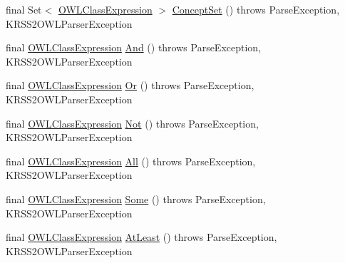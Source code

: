 \begin{DoxyCompactItemize}
\item 
final Set$<$ \hyperlink{interfaceorg_1_1semanticweb_1_1owlapi_1_1model_1_1_o_w_l_class_expression}{O\-W\-L\-Class\-Expression} $>$ \hyperlink{classde_1_1uulm_1_1ecs_1_1ai_1_1owlapi_1_1krssparser_1_1_k_r_s_s2_parser_a1e71dd29caf3474eab3a8c17827a211b}{Concept\-Set} ()  throws Parse\-Exception,     K\-R\-S\-S2\-O\-W\-L\-Parser\-Exception 
\item 
final \hyperlink{interfaceorg_1_1semanticweb_1_1owlapi_1_1model_1_1_o_w_l_class_expression}{O\-W\-L\-Class\-Expression} \hyperlink{classde_1_1uulm_1_1ecs_1_1ai_1_1owlapi_1_1krssparser_1_1_k_r_s_s2_parser_a3d580f7d488fcf9e884bb59ab786f604}{And} ()  throws Parse\-Exception, K\-R\-S\-S2\-O\-W\-L\-Parser\-Exception 
\item 
final \hyperlink{interfaceorg_1_1semanticweb_1_1owlapi_1_1model_1_1_o_w_l_class_expression}{O\-W\-L\-Class\-Expression} \hyperlink{classde_1_1uulm_1_1ecs_1_1ai_1_1owlapi_1_1krssparser_1_1_k_r_s_s2_parser_a8b0db9a91002cdbdc9a36670bc942006}{Or} ()  throws Parse\-Exception, K\-R\-S\-S2\-O\-W\-L\-Parser\-Exception 
\item 
final \hyperlink{interfaceorg_1_1semanticweb_1_1owlapi_1_1model_1_1_o_w_l_class_expression}{O\-W\-L\-Class\-Expression} \hyperlink{classde_1_1uulm_1_1ecs_1_1ai_1_1owlapi_1_1krssparser_1_1_k_r_s_s2_parser_ac8bb49479f32d0def2e9dad0e95f2b25}{Not} ()  throws Parse\-Exception, K\-R\-S\-S2\-O\-W\-L\-Parser\-Exception 
\item 
final \hyperlink{interfaceorg_1_1semanticweb_1_1owlapi_1_1model_1_1_o_w_l_class_expression}{O\-W\-L\-Class\-Expression} \hyperlink{classde_1_1uulm_1_1ecs_1_1ai_1_1owlapi_1_1krssparser_1_1_k_r_s_s2_parser_aac2a999fc0771463c7c3b0d1656c33ca}{All} ()  throws Parse\-Exception, K\-R\-S\-S2\-O\-W\-L\-Parser\-Exception 
\item 
final \hyperlink{interfaceorg_1_1semanticweb_1_1owlapi_1_1model_1_1_o_w_l_class_expression}{O\-W\-L\-Class\-Expression} \hyperlink{classde_1_1uulm_1_1ecs_1_1ai_1_1owlapi_1_1krssparser_1_1_k_r_s_s2_parser_a26b1060085fc8aca4b072eedebdb6b41}{Some} ()  throws Parse\-Exception, K\-R\-S\-S2\-O\-W\-L\-Parser\-Exception 
\item 
final \hyperlink{interfaceorg_1_1semanticweb_1_1owlapi_1_1model_1_1_o_w_l_class_expression}{O\-W\-L\-Class\-Expression} \hyperlink{classde_1_1uulm_1_1ecs_1_1ai_1_1owlapi_1_1krssparser_1_1_k_r_s_s2_parser_a9abb880ffc3e50c8dd3ccca36d987b47}{At\-Least} ()  throws Parse\-Exception,     K\-R\-S\-S2\-O\-W\-L\-Parser\-Exception 
\item 

\end{DoxyCompactItemize}
